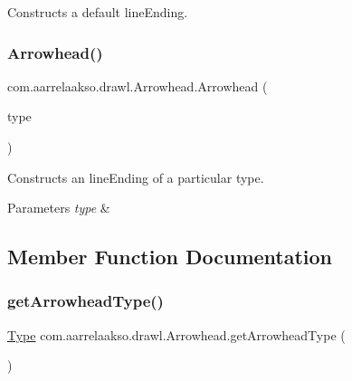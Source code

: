 Constructs a default lineEnding.

\mbox{\label{classcom_1_1aarrelaakso_1_1drawl_1_1_arrowhead_a43464dd3355fda0d6e295d4282433828}} 
\subsubsection{\texorpdfstring{Arrowhead()}{Arrowhead()}\hspace{0.1cm}{\footnotesize\ttfamily [2/2]}}
{\footnotesize\ttfamily com.\+aarrelaakso.\+drawl.\+Arrowhead.\+Arrowhead (\begin{DoxyParamCaption}\item[{@Not\+Null Arrowhead.\+Type}]{type }\end{DoxyParamCaption})}



Constructs an lineEnding of a particular type.


\begin{DoxyParams}{Parameters}
{\em type} & \\
\hline
\end{DoxyParams}


\subsection{Member Function Documentation}
\mbox{\label{classcom_1_1aarrelaakso_1_1drawl_1_1_arrowhead_a9826ae8d6876c83ff6e61f12b5afcd1a}} 
\subsubsection{\texorpdfstring{get\+Arrowhead\+Type()}{getArrowheadType()}}
{\footnotesize\ttfamily \hyperlink{enumcom_1_1aarrelaakso_1_1drawl_1_1_arrowhead_1_1_type}{Type} com.\+aarrelaakso.\+drawl.\+Arrowhead.\+get\+Arrowhead\+Type (\begin{DoxyParamCaption}{ }\end{DoxyParamCaption})\hspace{0.3cm}{\ttfamily [protected]}}



